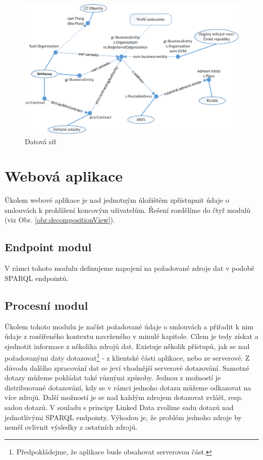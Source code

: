 \begin{figure}[H]
\centerline{\includegraphics[width=\textwidth]{img/architectureLinks.eps}}
\caption{Datová síť}
\label{obr:architectureLinks}
\end{figure}

\section{Webová aplikace}

Úkolem webové aplikace je nad jednotným úložištěm zpřístupnit údaje o smlouvách k prohlížení koncovým uživatelům. Řešení rozdělíme do čtyř modulů (viz Obr. \ref{obr:decompositionView}).

\subsection*{Endpoint modul}

V rámci tohoto modulu definujeme napojení na požadované zdroje dat v podobě SPARQL endpointů.

\subsection*{Procesní modul}

Úkolem tohoto modulu je načíst požadované údaje o smlouvách a přiřadit k nim údaje z rozšířeného kontextu navrženého v minulé kapitole. Cílem je tedy získat a sjednotit informace z několika zdrojů dat. Existuje několik přístupů, jak se nad požadovanými daty dotazovat\footnote{Předpokládejme, že aplikace bude obsahovat serverovou část.} - z klientské části aplikace, nebo ze serverové. Z důvodu dalšího zpracování dat se jeví vhodnější serverové dotazování. Samotné dotazy můžeme pokládat také různými způsoby. Jednou z možností je distribuované dotazování, kdy se v rámci jednoho dotazu můžeme odkazovat na více zdrojů. Další možností je se nad každým zdrojem dotazovat zvlášť, resp. sadou dotazů. V souladu s principy Linked Data zvolíme sadu dotazů nad jednotlivými SPARQL endpointy. Výhodou je, že problém jednoho zdroje by neměl ovlivnit výsledky z ostatních zdrojů. 

